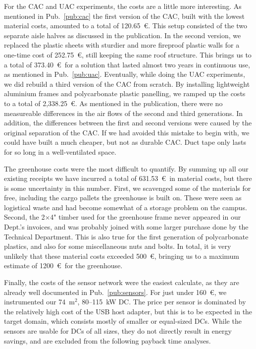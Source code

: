 \documentclass[officiallayout]{tktla}
\begin{document}
For the CAC and UAC experiments, the costs are a little more interesting. As
mentioned in Pub.~\ref{pub:cac} the first version of the CAC, built with the
lowest material costs, amounted to a total of 120.65~\euro. This setup
consisted of the two separate aisle halves as discussed in the publication. In
the second version, we replaced the plastic sheets with sturdier and more
fireproof plastic walls for a one-time cost of 252.75~\euro, still keeping the
same roof structure. This brings us to a total of 373.40~\euro\ for a solution
that lasted almost two years in continuous use, as mentioned in
Pub.~\ref{pub:uac}. Eventually, while doing the UAC experiments, we did
rebuild a third version of the CAC from scratch. By installing lightweight
aluminium frames and polycarbonate plastic panelling, we ramped up the costs
to a total of 2,338.25~\euro. As mentioned in the publication, there were no
measureable differences in the air flows of the second and third generations.
In addition, the differences between the first and second versions were caused
by the original separation of the CAC. If we had avoided this mistake to begin
with, we could have built a much cheaper, but not as durable CAC. Duct tape
only lasts for so long in a well-ventilated space.

The greenhouse costs were the most difficult to quantify. By summing up all
our existing receipts we have incurred a total of 631.53~\euro\ in material
costs, but there is some uncertainty in this number. First, we scavenged some
of the materials for free, including the cargo pallets the greenhouse is built
on.  These were seen as logistical waste and had become somewhat of a storage
problem on the campus. Second, the 2$\times$4" timber used for the greenhouse
frame never appeared in our Dept.'s invoices, and was probably joined with
some larger purchase done by the Technical Department. This is also true for
the first generation of polycarbonate plastics, and also for some
miscellaneous nuts and bolts. In total, it is very unlikely that these
material costs exceeded 500~\euro, bringing us to a maximum estimate of
1200~\euro\ for the greenhouse.

Finally, the costs of the sensor network were the easiest calculate, as they
are already well documented in Pub.~\ref{pub:sensors}. For just under
160~\euro, we instrumented our 74~m$^2$, 80--115~kW DC. The price per sensor
is dominated by the relatively high cost of the USB host adapter, but this is
to be expected in the target domain, which consists mostly of smaller or
equal-sized DCs. While the sensors are usable for DCs of all sizes, they do
not directly result in energy savings, and are excluded from the following
payback time analyses.
\end{document}
